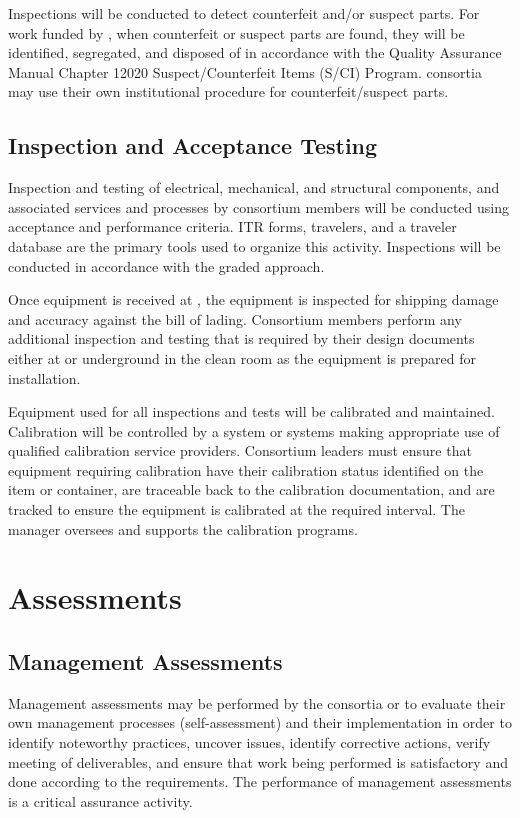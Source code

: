 Inspections will be conducted to detect counterfeit and/or suspect
parts. For work funded by , when counterfeit or suspect parts
are found, they will be identified, segregated, and disposed of in
accordance with the \fnal Quality Assurance Manual Chapter 12020
Suspect/Counterfeit Items (S/CI) Program.  consortia may
use their own institutional procedure for counterfeit/suspect parts.

\subsection{Inspection and Acceptance Testing}

Inspection and testing of electrical, mechanical, and structural
components, and associated services and processes by consortium members
will be conducted using acceptance and performance criteria. ITR
forms, travelers, and a traveler database are the primary tools used
to organize this activity. Inspections will be conducted in accordance
with the graded approach.

Once equipment is received at , the equipment is 
inspected for shipping damage and accuracy against the bill of lading. 
Consortium members perform any additional inspection and testing that 
is required by their design documents either at  or 
underground in the clean room as the equipment is prepared for 
installation.

Equipment used for all inspections and tests will be calibrated and
maintained. Calibration will be controlled by a system or systems
making appropriate use of qualified calibration service
providers. Consortium leaders must ensure that equipment requiring
calibration have their calibration status identified on the item or
container, are traceable back to the calibration documentation, and are
tracked to ensure the equipment is calibrated at the required
interval. The   manager 
oversees and supports the  calibration programs.

\section{Assessments}

\subsection{Management Assessments}

Management assessments may be performed by the consortia or 
to evaluate their own management processes (self-assessment) and their
implementation in order to identify noteworthy practices, uncover issues,
identify corrective actions, verify meeting of deliverables, and
ensure that work being performed is satisfactory and done according to the 
requirements. The performance of management assessments is a critical
assurance activity.

